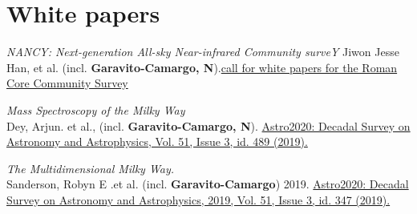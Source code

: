 \documentclass[UTF8]{article}
\begin{document}
\section*{White papers}

\begin{etaremune}
  \setcounter{enumi}{4}
\item \textit{NANCY: Next-generation All-sky Near-infrared Community surveY}
  Jiwon Jesse Han, et al. (incl. \textbf{Garavito-Camargo,
  N}).\href{https://arxiv.org/abs/2306.11784}{call for white papers for the
  Roman Core Community Survey}
\item \textit{Mass Spectroscopy of the Milky Way} \\
  Dey, Arjun. et al., (incl. \textbf{Garavito-Camargo, N}).
  \href{https://113qx216in8z1kdeyi404hgf-wpengine.netdna-ssl.com/wp-content/uploads/2019/05/489_dey.pdf}{Astro2020: Decadal
  Survey on Astronomy and Astrophysics, Vol. 51, Issue 3, id. 489 (2019).}
\item \textit{The Multidimensional Milky Way.}\\
 Sanderson, Robyn E .et al. (incl. \textbf{Garavito-Camargo}) 2019.
  \href{https://arxiv.org/abs/1909.07641}{Astro2020: Decadal Survey on
Astronomy and Astrophysics, 2019, Vol. 51, Issue 3, id. 347 (2019).} 
\end{etaremune}
\end{document}
